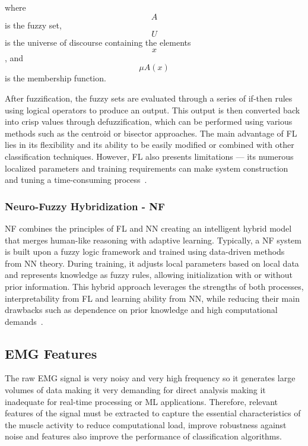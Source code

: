 where \[A\] is the fuzzy set, \[U\] is the universe of discourse containing the elements \[x\], and \[\mu A(x)\] is the membership function.

After fuzzification, the fuzzy sets are evaluated through a series of if-then rules using logical operators to produce an output. This output is then converted back into crisp values through defuzzification, which can be performed 
using various methods such as the centroid or bisector approaches.
The main advantage of FL lies in its flexibility and its ability to be easily modified or combined with other classification techniques. However, FL also presents limitations — its numerous localized parameters and training 
requirements can make system construction and tuning a time-consuming process~\cite{ComprehensiveStudyOnEMG}.

\subsubsection{Neuro-Fuzzy Hybridization - NF} 
\label{sssec:neuro_fuzzy_hybridization}

NF combines the principles of FL and NN creating an intelligent hybrid model that merges human-like reasoning with adaptive learning. Typically, a NF system is built upon a fuzzy logic framework and trained using data-driven methods 
from NN theory. During training, it adjusts local parameters based on local data and represents knowledge as fuzzy rules, allowing initialization with or without prior information. This hybrid approach leverages the strengths of both 
processes, interpretability from FL and learning ability from NN, while reducing their main drawbacks such as dependence on prior knowledge and high computational demands~\cite{ComprehensiveStudyOnEMG}.





\subsection{EMG Features}
\label{ssec:emg_features}
The raw \gls{EMG} signal is very noisy and very high frequency so it generates large volumes of data making it very demanding for direct analysis making it inadequate for real-time processing or \gls{ML} applications. Therefore, 
relevant features of the signal must be extracted to capture the essential characteristics of the muscle activity to reduce computational load, improve robustness against noise and features also improve the performance of classification 
algorithms. 

